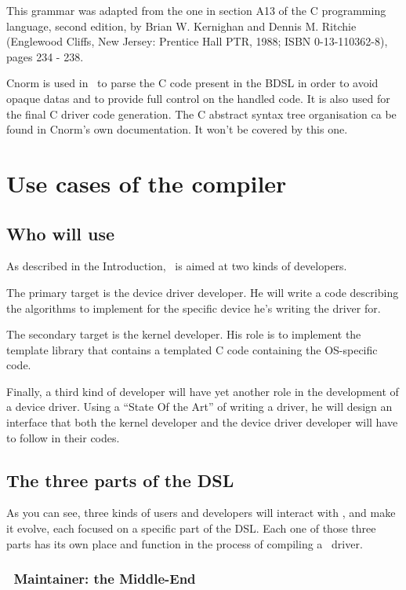 \documentclass[american]{rtxreport}
\begin{document}
This grammar was adapted from the one in section A13 of the C programming
language, second edition, by Brian W. Kernighan and Dennis M. Ritchie
(Englewood Cliffs, New Jersey: Prentice Hall PTR, 1988; ISBN 0-13-110362-8),
pages 234 - 238. 

Cnorm is used in \rtx\ to parse the C code present in the BDSL in order to
avoid opaque datas and to provide full control on the handled code. It is also
used for the final C driver code generation. The C abstract syntax tree
organisation ca be found in Cnorm's own documentation. It won't be covered by
this one.



\chapter{Use cases of the compiler}

\section{Who will use \rtx}

As described in the Introduction, \rtx\ is aimed at two kinds of developers.

The primary target is the device driver developer. He will write a code
describing the algorithms to implement for the specific device he's writing
the driver for.

The secondary target is the kernel developer. His role is to implement the
template library that contains a templated C code containing the
OS-specific code.

Finally, a third kind of developer will have yet another role in the
development of a device driver. Using a ``State Of the Art'' of writing a
driver, he will design an interface that both the kernel developer and
the device driver developer will have to follow in their codes.

\section{The three parts of the DSL}

As you can see, three kinds of users and developers will interact with \rtx,
and make it evolve, each focused on a specific part of the DSL.
Each one of those three parts has its own place and function in the process of
compiling a \rtx\ driver.

\subsection{\rtx\ Maintainer: the Middle-End}
\lstset{language=rti}
\end{document}
